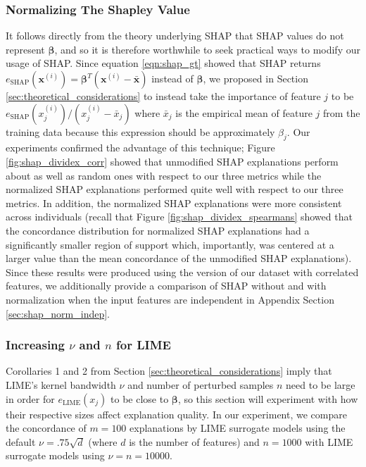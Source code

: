 \documentclass[mnsc,blindrev]{informs3}
\begin{document}
            \subsubsection{Normalizing The Shapley Value}
                It follows directly from the theory underlying SHAP that SHAP values do not represent $\boldsymbol{\beta}$, and so it is therefore worthwhile to seek practical ways to modify our usage of SHAP. Since equation \ref{eqn:shap_gt} showed that SHAP returns $e_{\text{SHAP}}(\mathbf{x}^{(i)})=\boldsymbol{\beta}^T(\mathbf{x}^{(i)} - \bar{\mathbf{x}})$ instead of $\boldsymbol{\beta}$, we proposed in Section \ref{sec:theoretical_considerations} to instead take the importance of feature $j$ to be $e_{\text{SHAP}}(x^{(i)}_j) / (x^{(i)}_j - \bar{x}_j)$ where $\bar{x}_j$ is the empirical mean of feature $j$ from the training data because this expression should be approximately $\beta_j$. Our experiments confirmed the advantage of this technique; Figure \ref{fig:shap_dividex_corr} showed that unmodified SHAP explanations perform about as well as random ones with respect to our three metrics while the normalized SHAP explanations performed quite well with respect to our three metrics. In addition, the normalized SHAP explanations were more consistent across individuals (recall that Figure \ref{fig:shap_dividex_spearmans} showed that the concordance distribution for normalized SHAP explanations had a significantly smaller region of support which, importantly, was centered at a larger value than the mean concordance of the unmodified SHAP explanations). Since these results were produced using the version of our dataset with correlated features, we additionally provide a comparison of SHAP without and with normalization when the input features are independent in Appendix Section \ref{sec:shap_norm_indep}.



        
        \subsubsection{Increasing $\nu$ and $n$ for LIME } 
            \label{sec:lime_params}
            Corollaries 1 and 2 from Section \ref{sec:theoretical_considerations} imply that LIME's kernel bandwidth $\nu$ and number of perturbed samples $n$ need to be large in order for $e_{\text{LIME}}(x_j)$ to be close to $\boldsymbol{\beta}$, so this section will experiment with how their respective sizes affect explanation quality. In our experiment, we compare the concordance of $m=100$ explanations by LIME surrogate models using the default $\nu = .75\sqrt{d}$ (where $d$ is the number of features) and $n=1000$ with LIME surrogate models using $\nu=n=10000$. 
            
\end{document}
